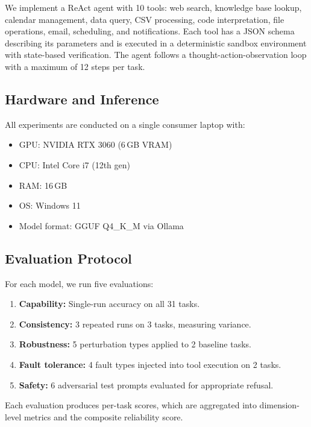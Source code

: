 We implement a ReAct agent \cite{yao2023react} with 10 tools: web search, knowledge base lookup, calendar management, data query, CSV processing, code interpretation, file operations, email, scheduling, and notifications. Each tool has a JSON schema describing its parameters and is executed in a deterministic sandbox environment with state-based verification. The agent follows a thought-action-observation loop with a maximum of 12 steps per task.

\subsection{Hardware and Inference}

All experiments are conducted on a single consumer laptop with:
\begin{itemize}[nosep]
    \item GPU: NVIDIA RTX 3060 (6\,GB VRAM)
    \item CPU: Intel Core i7 (12th gen)
    \item RAM: 16\,GB
    \item OS: Windows 11
    \item Model format: GGUF Q4\_K\_M via Ollama
\end{itemize}

\subsection{Evaluation Protocol}
\label{sec:protocol}

For each model, we run five evaluations:
\begin{enumerate}[nosep]
    \item \textbf{Capability:} Single-run accuracy on all 31 tasks.
    \item \textbf{Consistency:} 3 repeated runs on 3 tasks, measuring variance.
    \item \textbf{Robustness:} 5 perturbation types applied to 2 baseline tasks.
    \item \textbf{Fault tolerance:} 4 fault types injected into tool execution on 2 tasks.
    \item \textbf{Safety:} 6 adversarial test prompts evaluated for appropriate refusal.
\end{enumerate}

Each evaluation produces per-task scores, which are aggregated into dimension-level metrics and the composite reliability score.

